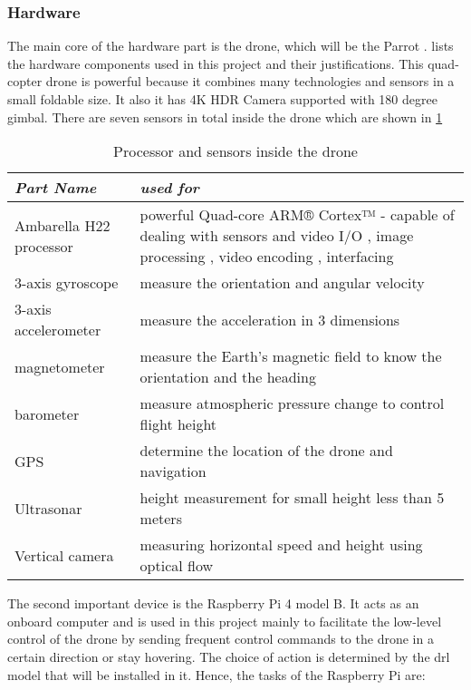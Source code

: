 \documentclass[../main.tex]{subfiles}
\begin{document}
\subsubsection{Hardware}

The main core of the hardware part is the drone, 
which will be the Parrot \anafi.
 lists the hardware components
used in this project and their justifications. This quad-copter
drone is powerful because it combines many technologies 
and sensors in a small foldable size. It also it has 4K HDR Camera supported 
with 180 degree gimbal. 
There are seven sensors in total inside the drone which are shown in 
\cref{tab:sensors-table} 


\begin{table}[H]
	\centering
	\caption{Processor and sensors inside the drone}
	\label{tab:sensors-table}  
	\begin{tabular}{ p{4cm} p{8cm} }
		\toprule
		\textit{Part Name} 
		& \textit{used for}  \\ 
		
		\midrule
		Ambarella H22 
		processor
		& powerful Quad-core ARM® Cortex™ - capable of dealing with sensors and video I/O , 
		image processing , video encoding , interfacing \\ 
		3-axis gyroscope
		& measure the orientation and angular velocity  \\ 
		3-axis accelerometer
		& measure the acceleration in 3 dimensions  \\ 
		magnetometer 
		& measure the Earth's magnetic field to know the orientation and the heading   \\ 
				barometer 
		& measure atmospheric pressure change to control flight height   \\ 
				GPS 
		& determine the location of the drone and navigation  \\ 
				Ultrasonar 
		&  height measurement for small height less than 5 meters  \\ 
				Vertical camera 
		&  measuring horizontal speed and height using optical flow \\ 
        \bottomrule
    \end{tabular}
\end{table}   

The second important device is the Raspberry Pi 4 model B. It 
acts as an onboard computer and is used in this project
mainly to facilitate the low-level control of the drone
by sending frequent control commands to the drone
in a certain direction or stay hovering.
The choice of action is determined by the \gls{drl}
model that will be installed in it.
Hence, the tasks of the Raspberry Pi are: 
\end{document}
